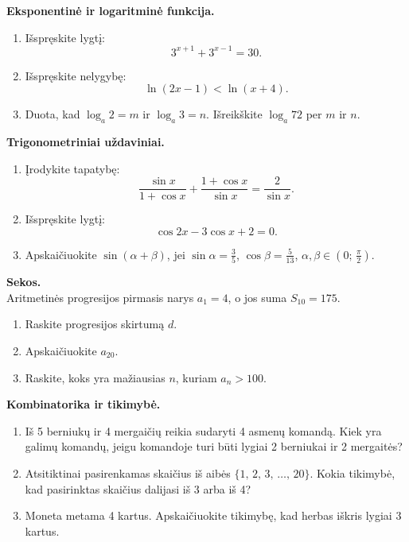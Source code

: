 \begin{exercise}
\textbf{Eksponentinė ir logaritminė funkcija.}
\begin{enumerate}[label=\arabic*.]
  \item Išspręskite lygtį:
  \[
    3^{x+1} + 3^{x-1} = 30.
  \]
  \item Išspręskite nelygybę:
  \[
    \ln(2x - 1) < \ln(x + 4).
  \]
  \item Duota, kad $\log_a 2 = m$ ir $\log_a 3 = n$. Išreikškite $\log_a 72$
        per $m$ ir $n$.
\end{enumerate}
\end{exercise}

\begin{exercise}
\textbf{Trigonometriniai uždaviniai.}
\begin{enumerate}[label=\arabic*.]
  \item Įrodykite tapatybę:
  \[
    \frac{\sin x}{1 + \cos x} + \frac{1 + \cos x}{\sin x} = \frac{2}{\sin x}.
  \]
  \item Išspręskite lygtį:
  \[
    \cos 2x - 3\cos x + 2 = 0.
  \]
  \item Apskaičiuokite $\sin\!\left(\alpha + \beta\right)$, jei
        $\sin\alpha = \tfrac{3}{5}$, $\cos\beta = \tfrac{5}{13}$,
        $\alpha, \beta \in \left(0;\,\tfrac{\pi}{2}\right)$.
\end{enumerate}
\end{exercise}

\begin{exercise}
\textbf{Sekos.}\\
Aritmetinės progresijos pirmasis narys $a_1 = 4$, o jos suma $S_{10} = 175$.
\begin{enumerate}[label=\arabic*.]
  \item Raskite progresijos skirtumą $d$.
  \item Apskaičiuokite $a_{20}$.
  \item Raskite, koks yra mažiausias $n$, kuriam $a_n > 100$.
\end{enumerate}
\end{exercise}

\begin{exercise}
\textbf{Kombinatorika ir tikimybė.}
\begin{enumerate}[label=\arabic*.]
  \item Iš 5 berniukų ir 4 mergaičių reikia sudaryti 4 asmenų komandą.
        Kiek yra galimų komandų, jeigu komandoje turi būti lygiai 2
        berniukai ir 2 mergaitės?
  \item Atsitiktinai pasirenkamas skaičius iš aibės $\{1,\, 2,\, 3,\, \ldots,\, 20\}$.
        Kokia tikimybė, kad pasirinktas skaičius dalijasi iš 3 arba iš 4?
  \item Moneta metama 4 kartus. Apskaičiuokite tikimybę, kad herbas iškris
        lygiai 3 kartus.
\end{enumerate}
\end{exercise}

